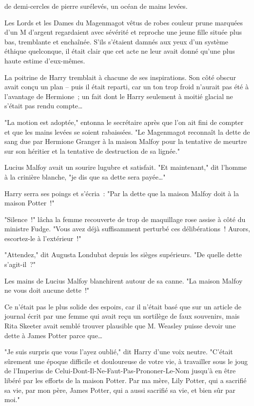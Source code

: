 
 de demi-cercles de pierre surélevés, un océan de mains levées.

\hplettrineextrapara
Les Lords et les Dames du Magenmagot vêtus de robes couleur prune marquées d'un M d'argent regardaient avec sévérité et reproche une jeune fille située plus bas, tremblante et enchaînée. S'ils s'étaient damnés aux yeux d'un système éthique quelconque, il était clair que cet acte ne leur avait donné qu'une plus haute estime d'eux-mêmes.

La poitrine de Harry tremblait à chacune de ses inspirations. Son côté obscur avait conçu un plan -- puis il était reparti, car un ton trop froid n'aurait pas été à l'avantage de Hermione~; un fait dont le Harry seulement à moitié glacial ne s'était pas rendu compte…

"La motion est adoptée," entonna le secrétaire après que l'on ait fini de compter et que les mains levées se soient rabaissées. "Le Magenmagot reconnaît la dette de sang due par Hermione Granger à la maison Malfoy pour la tentative de meurtre sur son héritier et la tentative de destruction de sa lignée."

Lucius Malfoy avait un sourire lugubre et satisfait. "Et maintenant," dit l'homme à la crinière blanche, "je dis que sa dette sera payée…"

Harry serra ses poings et s'écria~: "Par la dette que la maison Malfoy doit à la maison Potter~!"

"Silence~!" lâcha la femme recouverte de trop de maquillage rose assise à côté du ministre Fudge. "Vous avez déjà suffisamment perturbé ces délibérations~! Aurors, escortez-le à l'extérieur~!"

"Attendez," dit Augusta Londubat depuis les sièges supérieurs. "De quelle dette s'agit-il~?"

Les mains de Lucius Malfoy blanchirent autour de sa canne. "La maison Malfoy ne vous doit aucune dette~!"

Ce n'était pas le plus solide des espoirs, car il n'était basé que sur un article de journal écrit par une femme qui avait reçu un sortilège de faux souvenirs, mais Rita Skeeter avait semblé trouver plausible que M. Weasley puisse devoir une dette à James Potter parce que…

"Je suis surpris que vous l'ayez oublié," dit Harry d'une voix neutre. "C'était sûrement une époque difficile et douloureuse de votre vie, à travailler sous le joug de l'Imperius de Celui-Dont-Il-Ne-Faut-Pas-Prononer-Le-Nom jusqu'à en être libéré par les efforts de la maison Potter. Par ma mère, Lily Potter, qui a sacrifié sa vie, par mon père, James Potter, qui a aussi sacrifié sa vie, et bien sûr par moi."

